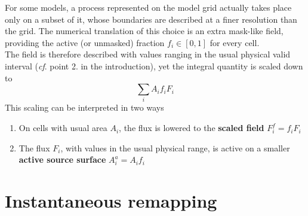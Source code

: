 For some models, a process represented on the model grid actually takes place only on a subset of it, whose boundaries are described at a finer resolution than the grid. The numerical translation of this choice is an extra mask-like field, providing the active (or unmasked) fraction \(f_i\in[0,1]\) for every cell.\\
The field is therefore described with values ranging in the usual physical valid interval (\emph{cf}. point 2. in the introduction), yet the integral quantity is scaled down to
\[\sum_iA_{i}f_iF_{i}\]
This scaling can be interpreted in two ways
\begin{enumerate}
    \item On cells with usual area \(A_i\), the flux is lowered to the {\bf scaled field} \(F^f_i=f_iF_i\)
    \item The flux \(F_i\), with values in the usual physical range, is active on a smaller {\bf active source surface} \(A^a_i = A_if_i\)

\end{enumerate}

\section{Instantaneous remapping}

